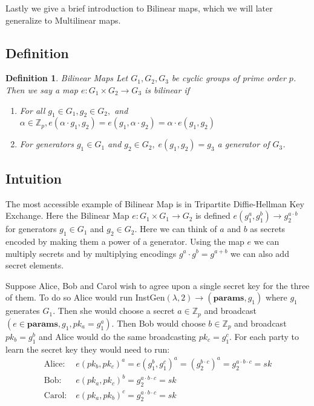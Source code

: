 \documentclass[12pt,twoside]{reedthesis}
\newtheorem{definition}{Definition}
\newcommand{\Z}[0]{\mathbb{Z}}
\begin{document}
    Lastly we give a brief introduction to Bilinear maps, which we will later generalize to Multilinear maps.
    
    \subsection{Definition}
    
    \begin{definition}{Bilinear Maps}
    Let $G_1,G_2,G_3$ be cyclic groups of prime order $p$. Then we say a map $e:G_1 \times G_2 \rightarrow G_3$ is bilinear if
    
    \begin{enumerate}
    \item For all $g_1 \in G_1, g_2\in G_2,$ and $ \alpha \in \Z_p, e(\alpha\cdot g_1,g_2) =e( g_1,\alpha\cdot g_2) = \alpha\cdot e(g_1,g_2) $
    \item For generators $g_1\in G_1$ and $g_2 \in G_2,\; e(g_1,g_2) = g_3$ a generator of $G_3$. 
    \end{enumerate}    
    \end{definition}
    
    \subsection{Intuition}
    \newcommand{\params}[0]{\textbf{params}}
    The most accessible example of Bilinear Map is in Tripartite Diffie-Hellman Key Exchange. Here the Bilinear Map $e:G_1 \times G_1 \rightarrow G_2$ is defined $e(g_1^a,g_1^b) \rightarrow g_2^{a\cdot b}$ for generators $g_1\in G_1$ and $g_2 \in G_2$. Here we can think of $a$ and $b$ as secrets encoded by making them a power of a generator. Using the map $e$ we can multiply secrets and by multiplying encodings $g^a\cdot g^b = g^{a+b}$ we can also add secret elements. 
\par Suppose Alice, Bob and Carol wish to agree upon a single secret key for the three of them. To do so Alice would run InstGen$(\lambda, 2) \to (\params,g_1)$ where $g_1$ generates $G_1$. Then she would choose a secret $a \in \Z_p$ and broadcast $(e \in \params, g_1, pk_a = g_1^a)$. Then Bob would choose $b\in \Z_p$ and broadcast $pk_b = g_1^b$ and Alice would do the same broadcasting $pk_c = g_1^c$. For each party to learn the secret key they would need to run:
\begin{align*}
\text{Alice:} & \; e(pk_b,pk_c)^a = e(g_1^b,g_1^c)^a = ( g_2^{b\cdot c} )^a = g_2^{a\cdot b \cdot c} = sk\\
\text{Bob:} &\; e(pk_a,pk_c)^b = g_2^{a \cdot b \cdot c} = sk \\
\text{Carol:}& \; e(pk_a,pk_b)^c = g_2^{a \cdot b \cdot c} = sk
\end{align*}
\end{document}
